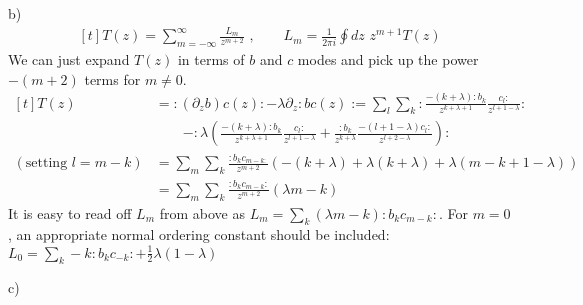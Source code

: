 \documentclass[12pt]{article}
\begin{document}
\begin{paragraph}{b)}
\begin{equation}
\begin{aligned}[t]
T(z)=\sum\limits_{m=-\infty}^{\infty}\frac{L_m}{z^{m+2}}\,\, ,\qquad L_m=\frac{1}{2\pi i}\oint dz \,\, z^{m+1}T(z)
\end{aligned}
\end{equation}
We can just expand $T(z)$ in terms of $b$ and $c$ modes and pick up the power $-(m+2)$ terms for $m\neq 0$.
\begin{equation}
\begin{aligned}[t]
T(z)&= : (\partial_z b) c(z): - \lambda \partial_z : b c (z):=\sum\limits_l\sum\limits_k :\frac{-(k+\lambda):b_k}{z^{k+\lambda+1}}\frac{c_l:}{z^{l+1-\lambda}}:\\
&\qquad-:\lambda(\frac{-(k+\lambda):b_k}{z^{k+\lambda+1}}\frac{c_l:}{z^{l+1-\lambda}}+\frac{:b_k}{z^{k+\lambda}}\frac{-(l+1-\lambda)c_l:}{z^{l+2-\lambda}}):\\
(\text{setting  }l=m-k)&=\sum\limits_{m}\sum\limits_{k}\frac{:b_k c_{m-k:}}{z^{m+2}}(-(k+\lambda)+\lambda(k+\lambda)+\lambda(m-k+1-\lambda))\\
&=\sum\limits_{m}\sum\limits_{k}\frac{:b_k c_{m-k}:}{z^{m+2}}(\lambda  m-k)
\end{aligned}
\end{equation}
It is easy to read off $L_m$ from above as $L_m=\sum\limits_{k}(\lambda  m-k):b_k c_{m-k}:$. For $m=0$, an appropriate normal ordering constant should be included: $L_0=\sum\limits_{k}  -k:b_k c_{-k}:+\frac{1}{2}\lambda(1-\lambda)$
\end{paragraph}
\begin{paragraph}{c)}

\end{paragraph}
\end{document}
